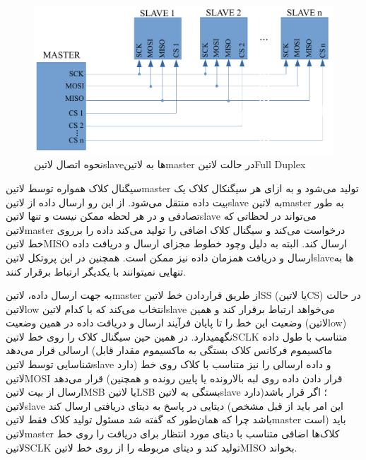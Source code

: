 \begin{figure}[!h]
	\centering
	\includegraphics[width=.7\linewidth]{Assets/SPI.pdf}
	\caption{نحوه اتصال ‌لاتین{slave}ها به ‌لاتین{master} در حالت ‌لاتین{Full Duplex} }
	\label{fig:SPIWiring}
\end{figure}

سیگنال کلاک همواره توسط ‌لاتین{master} تولید می‌شود و به ازای هر سیگنکال کلاک یک بیت داده منتقل می‌شود. از این رو ارسال داده از ‌لاتین{slave} به ‌لاتین{master} به طور تصادفی و در هر لحظه ممکن نیست و تنها ‌لاتین{slave} می‌تواند در لحظاتی که ‌لاتین{master} درخواست می‌کند و سیگنال کلاک اضافی را تولید می‌کند داده را برروی خط ‌لاتین{MISO} ارسال کند. البته به دلیل وچود خطوط مجزای ارسال و دریافت داده ارسال و دریافت همزمان داده نیز ممکن است. همچنین در این پروتکل ‌لاتین{slave}ها به تنهایی نمیتوانند با یکدیگر ارتباط برقرار کنند.

به جهت ارسال داده، ‌لاتین{master} از طریق قراردادن خط ‌لاتین{SS} (یا ‌لاتین{CS}) در حالت ‌لاتین{low} انتخاب می‌کند که با کدام ‌لاتین{slave} می‌خواهد ارتباط برقرار کند و همین وضعیت این خط را تا پایان فرآیند ارسال و دریافت داده در همین وضعیت (‌لاتین{low}) نگهمیدارد. در همین حین سیگنال کلاک را روی خط ‌لاتین{SCLK} متناسب با طول داده ارسالی قرار می‌دهد (ماکسیموم فرکانس کلاک بستگی به ماکسیموم مقدار قابل شناسایی توسط ‌لاتین{slave} دارد) و داده ارسالی را نیز متناسب با کلاک روی خط ‌لاتین{MOSI} قرار می‌دهد (قرار دادن داده روی لبه بالارونده یا پایین رونده و همچنین ارسال از بیت ‌لاتین{MSB} یا ‌لاتین{LSB} بستگی به ‌لاتین{slave} دارد)؛ اگر قرار باشد ‌لاتین{slave} دیتایی در پاسخ به دیتای دریافتی ارسال کند (این امر باید از قبل مشخص باشد چرا که همان‌طور که گفته شد مسئول تولید کلاک فقط ‌لاتین{master} است) باید ‌لاتین{master} کلاک‌ها اضافی متناسب با دیتای مورد انتظار برای دریافت را روی خط ‌لاتین{SCLK} تولید کند و دیتای مربوطه را از روی خط ‌لاتین{MISO} بخواند.


